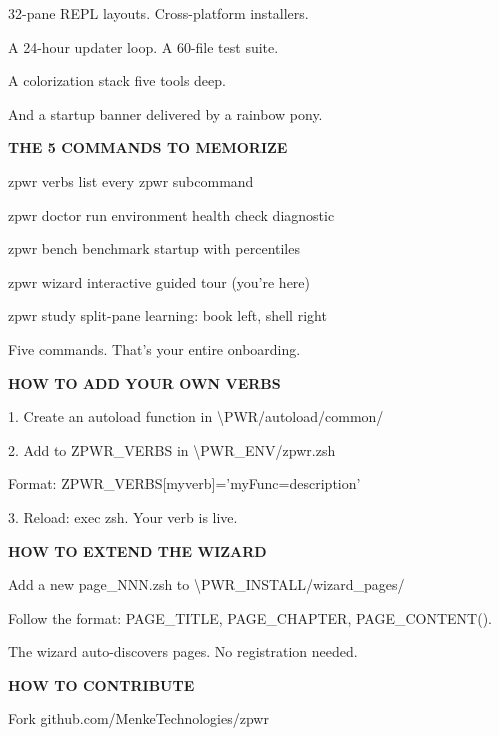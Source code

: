 \documentclass[11pt,a4paper,twoside]{book}
\begin{document}
32-pane REPL layouts. Cross-platform installers.

A 24-hour updater loop. A 60-file test suite.

A colorization stack five tools deep.

And a startup banner delivered by a rainbow pony.


\vspace{12pt}
{\bfseries\color{neonyellow} THE 5 COMMANDS TO MEMORIZE}\vspace{4pt}

zpwr verbs    list every zpwr subcommand

zpwr doctor   run environment health check diagnostic

zpwr bench    benchmark startup with percentiles

zpwr wizard   interactive guided tour (you're here)

zpwr study    split-pane learning: book left, shell right

Five commands. That's your entire onboarding.


\vspace{12pt}
{\bfseries\color{neonyellow} HOW TO ADD YOUR OWN VERBS}\vspace{4pt}

1. Create an autoload function in \textbackslash{}PWR/autoload/common/

\begin{codebox}
2. Add to ZPWR\_VERBS in \textbackslash{}PWR\_ENV/zpwr.zsh\\
\end{codebox}

Format: ZPWR\_VERBS[myverb]='myFunc=description'

3. Reload: exec zsh. Your verb is live.


\vspace{12pt}
{\bfseries\color{neonyellow} HOW TO EXTEND THE WIZARD}\vspace{4pt}

Add a new page\_NNN.zsh to \textbackslash{}PWR\_INSTALL/wizard\_pages/

Follow the format: PAGE\_TITLE, PAGE\_CHAPTER, PAGE\_CONTENT().

The wizard auto-discovers pages. No registration needed.


\vspace{12pt}
{\bfseries\color{neonyellow} HOW TO CONTRIBUTE}\vspace{4pt}

Fork github.com/MenkeTechnologies/zpwr
\end{document}
